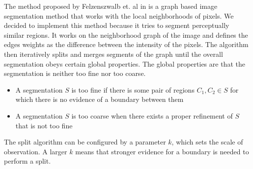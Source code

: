 \documentclass[pdftex,12pt,a4paper]{report}
\begin{document}
The method proposed by Felzenszwalb et. al in \cite{felzenszwalb2004efficient} is a graph based image segmentation method that works with the local neighborhoods of pixels. We decided to implement this method because it tries to segment perceptually similar regions. It works on the neighborhood graph of the image and defines the edges weights as the difference between the intensity of the pixels. The algorithm then iteratively splits and merges segments of the graph until the overall segmentation obeys certain global properties. The global properties are that the segmentation is neither too fine nor too coarse.

\begin{itemize}
	\item A segmentation $S$ is too fine if there is some pair of regions $C_1, C_2 \in S$ for which there is no evidence of a boundary between them
	\item A segmentation $S$ is too coarse when there exists a proper refinement of $S$ that is not too fine
\end{itemize}

The split algorithm can be configured by a parameter $k$, which sets the scale of observation. A larger $k$ means that stronger evidence for a boundary is needed to perform a split.
\end{document}
